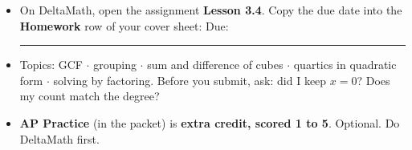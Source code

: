 \documentclass[aspectratio=169, 11pt]{beamer}
\begin{document}
\begin{frame}[t, plain]

  \begin{itemize}\setlength{\itemsep}{8pt}
    \item On DeltaMath, open the assignment \textbf{Lesson 3.4}. Copy the due date into the
          \textbf{Homework} row of your cover sheet: \quad Due: \rule{3cm}{0.4pt}
    \item Topics: GCF $\cdot$ grouping $\cdot$ sum and difference of cubes $\cdot$ quartics in
          quadratic form $\cdot$ solving by factoring. Before you submit, ask: did I keep
          $x = 0$? Does my count match the degree?
    \item \textbf{AP Practice} (in the packet) is \textbf{extra credit, scored 1 to 5}. Optional.
          Do DeltaMath first.
  \end{itemize}
\end{frame}
\end{document}
